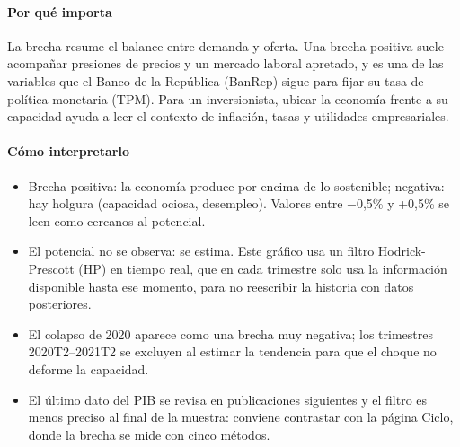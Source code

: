 \paragraph{Por qué importa}
La brecha resume el balance entre demanda y oferta. Una brecha positiva suele acompañar presiones de precios y un mercado laboral apretado, y es una de las variables que el Banco de la República (BanRep) sigue para fijar su tasa de política monetaria (TPM). Para un inversionista, ubicar la economía frente a su capacidad ayuda a leer el contexto de inflación, tasas y utilidades empresariales.

\paragraph{Cómo interpretarlo}
\begin{itemize}
\item Brecha positiva: la economía produce por encima de lo sostenible; negativa: hay holgura (capacidad ociosa, desempleo). Valores entre −0,5\% y +0,5\% se leen como cercanos al potencial.
\item El potencial no se observa: se estima. Este gráfico usa un filtro Hodrick-Prescott (HP) en tiempo real, que en cada trimestre solo usa la información disponible hasta ese momento, para no reescribir la historia con datos posteriores.
\item El colapso de 2020 aparece como una brecha muy negativa; los trimestres 2020T2–2021T2 se excluyen al estimar la tendencia para que el choque no deforme la capacidad.
\item El último dato del PIB se revisa en publicaciones siguientes y el filtro es menos preciso al final de la muestra: conviene contrastar con la página Ciclo, donde la brecha se mide con cinco métodos.
\end{itemize}
\begin{formulas}[Fórmulas]
\end{formulas}
